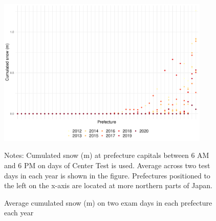 \documentclass[12pt,letterpaper]{article}
\begin{document}
\begin{figure}[H]
  \centering
  \caption{Average cumulated snow (m) on two exam days in each prefecture each year}
  \includegraphics[width = 0.9\textwidth]{../Output/images/cum_snow_diff.pdf}
  \label{fig:cum_snow_diff}
  \footnotesize
  \begin{tablenotes}
    \item Notes:
      Cumulated snow (m) at prefecture capitals between 6 AM and 6 PM on days of Center Test is used.
      Average across two test days in each year is shown in the figure.
      Prefectures positioned to the left on the x-axis are located at more northern parts of Japan.
  \end{tablenotes}
\end{figure}

%
\end{document}
